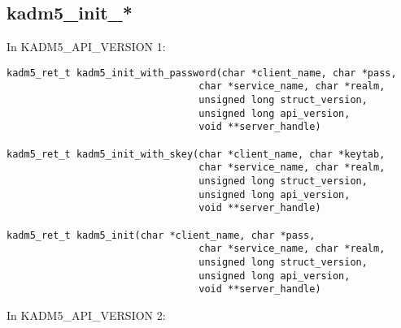 
\subsection{kadm5_init_*}

In KADM5_API_VERSION 1:

\begin{verbatim}
kadm5_ret_t kadm5_init_with_password(char *client_name, char *pass,
                                 char *service_name, char *realm,
                                 unsigned long struct_version,
                                 unsigned long api_version,
                                 void **server_handle)

kadm5_ret_t kadm5_init_with_skey(char *client_name, char *keytab,
                                 char *service_name, char *realm,
                                 unsigned long struct_version,
                                 unsigned long api_version,
                                 void **server_handle)

kadm5_ret_t kadm5_init(char *client_name, char *pass,
                                 char *service_name, char *realm,
                                 unsigned long struct_version,
                                 unsigned long api_version,
                                 void **server_handle)
\end{verbatim}

In KADM5_API_VERSION 2:

